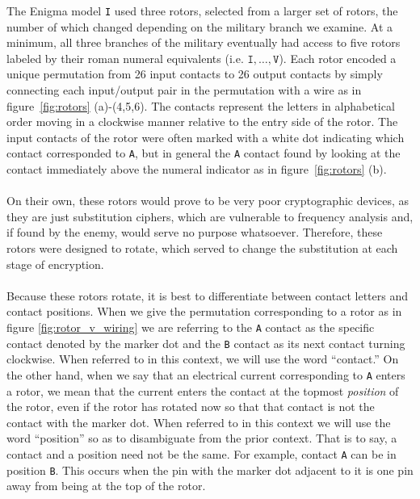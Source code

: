 The Enigma model \texttt{I} used three rotors, selected from a larger
set of rotors, the number of which changed depending on the military
branch we examine. At a minimum, all three branches of the military eventually
had access to five rotors labeled by their roman numeral equivalents
(i.e. $\texttt{I},\dots,\texttt{V}$).
Each rotor encoded a unique permutation from 26 input contacts to 26
output contacts by simply connecting each input/output pair
in the permutation with a wire as in figure~\ref{fig:rotors}
(a)-(4,5,6). The contacts represent the letters
in alphabetical order moving in a clockwise manner relative to the
entry side of the rotor. The input contacts of the rotor were often marked
with a white dot indicating which contact corresponded to \texttt{A},
but in general the \texttt{A} contact found by looking at the contact immediately above
the numeral indicator as in figure~\ref{fig:rotors} (b).
\\\\On their own, these rotors would prove to be very poor
cryptographic devices, as they are just substitution ciphers, which are
vulnerable to frequency analysis and, if found by the enemy, would
serve no purpose whatsoever. Therefore, these rotors were designed to
rotate, which served to change the substitution at each stage of encryption.
\\\\Because these rotors rotate, it is best to differentiate between
contact letters and contact positions. When we give the permutation
corresponding to a rotor as in figure \ref{fig:rotor_v_wiring} we are
referring to the \texttt{A} contact as the specific contact denoted
by the marker dot and the \texttt{B} contact as its next contact
turning clockwise. When referred to in this context, we will use the
word ``contact.'' On the other hand, when we say that an electrical
current corresponding to \texttt{A} enters a rotor, we mean
that the current enters the contact at the topmost \emph{position} of
the rotor, even if the rotor has rotated now so that that contact
is not the contact with the marker dot. When referred to in this
context we will use the word ``position'' so as to disambiguate from
the prior context. That is to say, a contact and a position need not
be the same. For example, contact \texttt{A} can be in position
\texttt{B}. This occurs when the pin with the marker dot adjacent to
it is one pin away from being at the top of the rotor.

